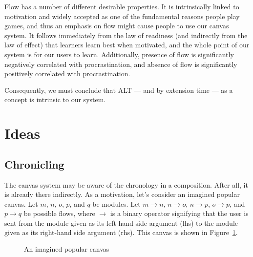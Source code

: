 \documentclass{article}
\begin{document}
\begin{multicols}{2}
Flow has a number of different desirable properties. It is intrinsically 
linked to motivation and widely accepted as one of the fundamental reasons 
people play games\cite{murphy2011games}, and thus an emphasis on flow might 
cause people to use our canvas system. It follows immediately from the law of 
readiness (and indirectly from the law of effect) that learners learn best 
when motivated\cite{murphy2011games}, and the whole point of our system is for 
our users to learn. Additionally, presence of flow is significantly negatively 
correlated with procrastination, and absence of flow is significantly 
positively correlated with procrastination\cite{lee2005relationship}.

Consequently, we must conclude that ALT --- and by extension time --- as a 
concept is intrinsic to our system.
 
\section{Ideas}
\subsection{Chronicling}
\label{chronology}
The canvas system may be aware of the chronology in a composition. After all, 
it is already there indirectly. As a motivation, let's consider an imagined 
popular canvas. Let $m$, $n$, $o$, $p$, and $q$ be modules. Let $m \to n$, $n 
\to o$, $n \to p$, $o \to p$, and $p \to q$ be possible flows, where $\to$ is 
a binary operator signifying that the user is sent from the module given as 
its left-hand side argument (lhs) to the module given as its right-hand side 
argument (rhs). This canvas is shown in Figure~\ref{canvas}.

\begin{figure}[H]
\begin{centering}
\caption{An imagined popular canvas}
\label{canvas}
\end{centering}
\end{figure}


\end{multicols}
\end{document}
